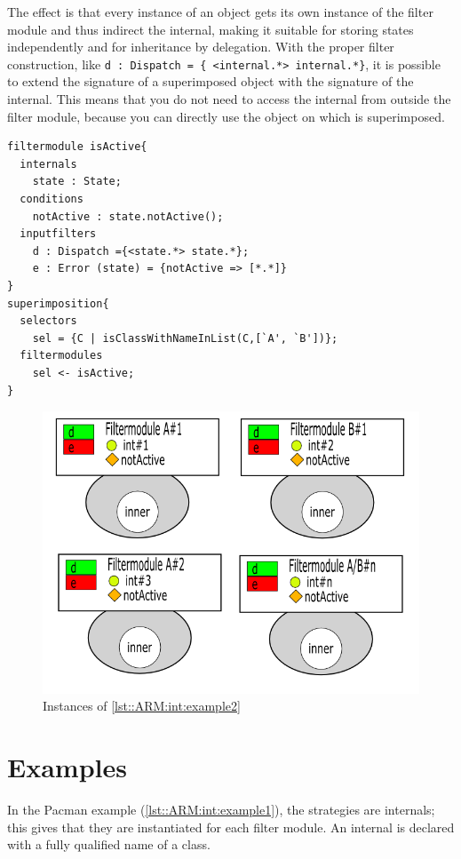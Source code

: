 The effect is that every instance of an object gets its own instance of the filter module and thus
indirect the internal, making it suitable for storing states independently and for inheritance by
delegation. With the proper filter construction, like \lstinline!d : Dispatch = { <internal.*> internal.*}!, 
it is possible to extend the signature of a superimposed object with the signature of the internal.
This means that you do not need to access the internal from outside the filter module, because you can directly
use the object on which is superimposed.

\begin{lstlisting}[caption = {Example 2, a filter module to hold a state}, label = lst::ARM:int:example2,
style=listing, language=ComposeStar, float = tpb]
filtermodule isActive{
  internals
    state : State;
  conditions
    notActive : state.notActive();
  inputfilters
    d : Dispatch ={<state.*> state.*};
    e : Error (state) = {notActive => [*.*]}
}
superimposition{
  selectors
    sel = {C | isClassWithNameInList(C,[`A', `B'])};
  filtermodules
    sel <- isActive;
}
\end{lstlisting}

\begin{figure}[tpb]
	\centering
	\includegraphics[style=thirdheight]{images/ARM-internalInitialization}
	\caption{Instances of \autoref{lst::ARM:int:example2}}
	\label{fig::arm::int:initialisation}
\end{figure}

\section*{Examples}
In the Pacman example (\autoref{lst::ARM:int:example1}), the strategies
are internals; this gives that they are instantiated for each 
filter module. An internal is declared with a fully qualified name
of a class.

